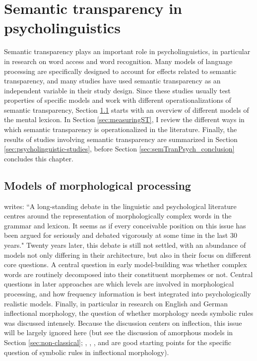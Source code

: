 \chapter{Semantic transparency in psycholinguistics}
\label{cha:semTranPsycho}

Semantic transparency plays an important role in
psycholinguistics, in particular in research on word access and word
recognition. Many models of language processing are specifically designed %
to account for effects related to semantic transparency, and many
studies have used semantic transparency as an independent variable in
their study design. Since these studies usually test properties of
specific models and work with different operationalizations of
semantic transparency, Section \ref{sec:models}
starts with an overview of
different models of the mental lexicon. In Section \ref{sec:measuringST}, I review the
different ways in which semantic transparency is operationalized in
the literature. Finally, the results of studies involving semantic transparency are summarized
in Section \ref{sec:psycholinguistic-studies}, before Section
\ref{sec:semTranPsych_conclusion} concludes this chapter.

\section[Structure and lexical access]{Models of morphological processing }
\label{sec:models}
\citet{Bybee:1995} writes: ``A long-standing debate in the linguistic
and psychological literature centres around the representation of
morphologically complex words in the grammar and lexicon. It seems as
if every conceivable position on this issue has been argued for
seriously and debated vigorously at some time in the last 30 years."
Twenty years later, this debate is still not settled, with an
abundance of models not only differing in their architecture, but also
in their focus on different core questions. A central question in
early model-building was whether complex words are routinely
decomposed into their constituent morphemes or not. Central questions
in later approaches are which levels are involved in
morphological processing, and how frequency information is best
integrated into psychologically realistic models. Finally, in
particular in research on English and German inflectional morphology,
the question of whether morphology needs symbolic rules was discussed
intensely. Because the discussion centers on inflection, this issue
will be largely ignored here (but see the discussion of amorphous
models in Section \ref{sec:non-classical};
\citealt{McClellandandPatterson:2002b},
\citealt{McClellandandPatterson:2002},
\citealt{PinkerandUllman:2002b}, and \citealt{PinkerandUllman:2002}
are good starting points for the specific question of symbolic rules
in inflectional morphology).

